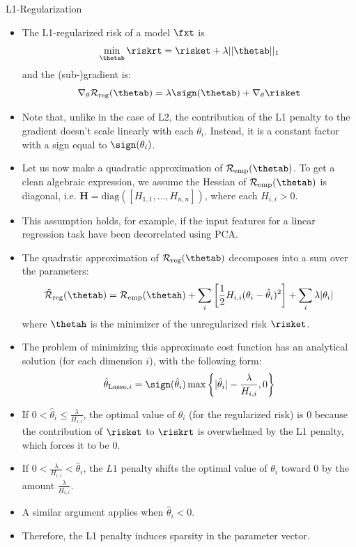 \begin{vbframe} {L1-Regularization}
\begin{itemize}
\item The L1-regularized risk of a model $\fxt$ is
\[\min_{\thetab} \riskrt = \risket + \lambda ||\thetab||_1\] 
and the (sub-)gradient is:
$$\nabla_{\theta} \mathcal{R}_{\text{reg}}(\thetab) = \lambda \sign(\thetab) + \nabla_{\theta} \risket$$
\item Note that, unlike in the case of L2, the contribution of the L1 penalty to the gradient doesn't scale linearly with each $\theta_i$. Instead, it is a constant factor with a sign equal to $\sign(\theta_i)$.
\item Let us now make a quadratic approximation of $\mathcal{R}_{\text{emp}}(\thetab)$. To get a clean algebraic expression, we assume the Hessian of $\mathcal{R}_{\text{emp}}(\thetab)$ is diagonal, i.e. $\bm{H} = \text{diag}([H_{1,1}, \ldots , H_{n,n}])$, where each $H_{i,i} > 0$.
\item This assumption holds, for example, if the input features for a linear regression task have been decorrelated using PCA.
\end{itemize}
\framebreak

\begin{itemize}
\item The quadratic approximation of $\mathcal{R}_{\text{reg}}(\thetab)$ decomposes into a sum over the parameters:
  $$\mathcal{\tilde R}_{\text{reg}}(\thetab) = \mathcal{R}_{\text{emp}}(\thetah) + \sum_i \left[ \frac{1}{2} H_{i,i} (\theta_i - \hat{\theta}_i)^2 \right] + \sum_i \lambda |\theta_i|$$
  where $\thetah$ is the minimizer of the unregularized risk $\risket$.
\item The problem of minimizing this approximate cost function has an analytical solution (for each dimension $i$), with the following form:
$$\hat{\theta}_{\text{Lasso},i} = \sign(\hat{\theta}_i) \max \left\{ |\hat{\theta}_i| - \frac{\lambda}{H_{i,i}},0 \right\}$$
\item If  $0 < \hat{\theta}_i \leq \frac{\lambda}{H_{i,i}}$, the optimal value of $\theta_i$ (for the regularized risk) is $0$ because the contribution of  $\risket$ to $\riskrt$ is overwhelmed by the L1 penalty, which forces it to be $0$.
\item If $0 < \frac{\lambda}{H_{i,i}} < \hat{\theta}_i$, the $L1$ penalty shifts the optimal value of $\theta_i$ toward 0 by the amount $\frac{\lambda}{H_{i,i}}$.
\item A similar argument applies when $\hat{\theta}_i < 0$. 
\item Therefore, the L1 penalty induces sparsity in the parameter vector.
\end{itemize}
\end{vbframe}

